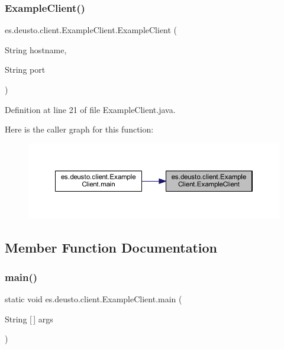 \subsubsection{\texorpdfstring{ExampleClient()}{ExampleClient()}}
{\footnotesize\ttfamily es.\+deusto.\+client.\+Example\+Client.\+Example\+Client (\begin{DoxyParamCaption}\item[{String}]{hostname,  }\item[{String}]{port }\end{DoxyParamCaption})}



Definition at line 21 of file Example\+Client.\+java.

Here is the caller graph for this function\+:
\nopagebreak
\begin{figure}[H]
\begin{center}
\leavevmode
\includegraphics[width=350pt]{classes_1_1deusto_1_1client_1_1_example_client_afe4bf9d0ff661de1e0ba936df0ce807f_icgraph}
\end{center}
\end{figure}


\subsection{Member Function Documentation}
\mbox{\label{classes_1_1deusto_1_1client_1_1_example_client_a9eadbc017db92b83cad1f6b72c10bae2}} 
\subsubsection{\texorpdfstring{main()}{main()}}
{\footnotesize\ttfamily static void es.\+deusto.\+client.\+Example\+Client.\+main (\begin{DoxyParamCaption}\item[{String \mbox{[}$\,$\mbox{]}}]{args }\end{DoxyParamCaption})\hspace{0.3cm}{\ttfamily [static]}}



